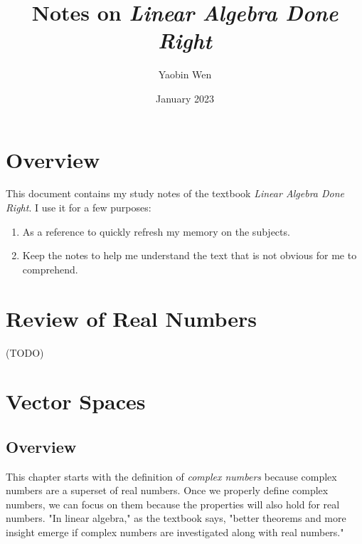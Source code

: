 \documentclass[12pt, letterpaper, oneside]{book}
\title{Notes on \textit{Linear Algebra Done Right}}
\author{Yaobin Wen}
\date{January 2023}
\begin{document}
\maketitle
\tableofcontents

\chapter*{Overview}

This document contains my study notes of the textbook \textit{Linear Algebra
Done Right}. I use it for a few purposes:

\begin{enumerate}
  \item As a reference to quickly refresh my memory on the subjects.
  \item Keep the notes to help me understand the text that is not obvious for
    me to comprehend.
\end{enumerate}

%
%

\chapter*{Review of Real Numbers}

(TODO)

%
%

\chapter{Vector Spaces}

\section{Overview}

This chapter starts with the definition of \emph{complex numbers} because
complex numbers are a superset of real numbers. Once we properly define complex
numbers, we can focus on them because the properties will also hold for real
numbers. "In linear algebra," as the textbook says, "better theorems and more
insight emerge if complex numbers are investigated along with real numbers."
\end{document}
